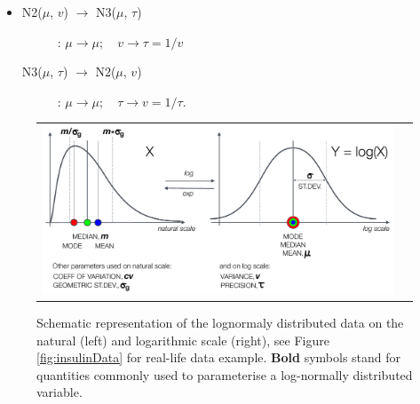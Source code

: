 {\begin{itemize}
\begin{description}
\item[N3($\mu$, $\tau$) $\rightarrow$ N1($\mu$, $\sigma$)]:
$\mu \rightarrow \mu; \quad \tau \rightarrow \sigma=1/\sqrt{\tau}$
\end{description}

\item 
\begin{description}
\item[N2($\mu$, $v$) $\rightarrow$ N3($\mu$, $\tau$)]:
$\mu \rightarrow \mu; \quad v \rightarrow \tau=1/v$

\item[N3($\mu$, $\tau$) $\rightarrow$ N2($\mu$, $v$)]:
$\mu \rightarrow \mu; \quad \tau \rightarrow v=1/\tau$.
\end{description}
\end{itemize}

\begin{figure}[htb!]
\centering
\begin{tabular}{cc}
 \includegraphics[width=160mm]{pics/LogNormalNormalSchema}
\end{tabular}
\caption{Schematic representation of the lognormaly distributed data on the natural (left) 
and logarithmic scale (right), see Figure \ref{fig:insulinData} for real-life data example. 
\textbf{Bold} symbols stand for quantities commonly used to parameterise a log-normally 
distributed variable.}
\label{fig:schematicLogNormal}
\end{figure}

}

